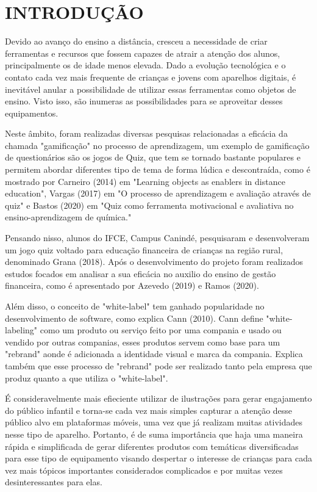 \chapter{INTRODUÇÃO}
\thispagestyle{empty}

Devido ao avanço do ensino a distância, cresceu a necessidade de criar ferramentas e recursos que fossem capazes de atrair a atenção dos alunos, principalmente os de idade menos elevada. Dado a evolução tecnológica e o contato cada vez mais frequente de crianças e jovens com aparelhos digitais, é inevitável anular a possibilidade de utilizar essas ferramentas como objetos de ensino. Visto isso, são inumeras as possibilidades para se aproveitar desses equipamentos.

Neste âmbito, foram realizadas diversas pesquisas relacionadas a eficácia da chamada "gamificação" no processo de aprendizagem, um exemplo de gamificação de questionários são os jogos de Quiz, que tem se tornado bastante populares e permitem abordar diferentes tipo de tema de forma lúdica e descontraída, como é mostrado por Carneiro (2014) em "Learning objects as enablers in distance education"\nocite{carneiro2014learning}, Vargas (2017) em "O processo de aprendizagem e avaliação através de
quiz"\nocite{vargas2017processo} e Bastos (2020) em "Quiz como ferramenta motivacional e avaliativa no ensino-aprendizagem de química."\nocite{bastos2020quiz}

Pensando nisso, alunos do IFCE, Campus Canindé, pesquisaram e desenvolveram um jogo quiz voltado para educação financeira de crianças na região rural, denominado Grana (2018)\nocite{pereira2018grana}. Após o desenvolvimento do projeto foram realizados estudos focados em analisar a sua eficácia no auxilio do ensino de gestão financeira, como é apresentado por Azevedo (2019)\nocite{azevedo2019analise} e Ramos (2020)\nocite{ramos2020analise}.

Além disso, o conceito de "white-label" tem ganhado popularidade no desenvolvimento de software, como explica Cann (2010). Cann define "white-labeling" como um produto ou serviço feito por uma compania e usado ou vendido por outras companias, esses produtos servem como base para um "rebrand" aonde é adicionada a identidade visual e marca da compania. Explica também que esse processo de "rebrand" pode ser realizado tanto pela empresa que produz quanto a que utiliza o "white-label".

É consideravelmente mais efieciente utilizar de ilustrações para gerar engajamento do público infantil e torna-se cada vez mais simples capturar a atenção desse público alvo em plataformas móveis, uma vez que já realizam muitas atividades nesse tipo de aparelho. Portanto, é de suma importância que haja uma maneira rápida e simplificada de gerar diferentes produtos com temáticas diversificadas para esse tipo de equipamento visando despertar o interesse de crianças para cada vez mais tópicos importantes considerados complicados e por muitas vezes desinteressantes para elas.


